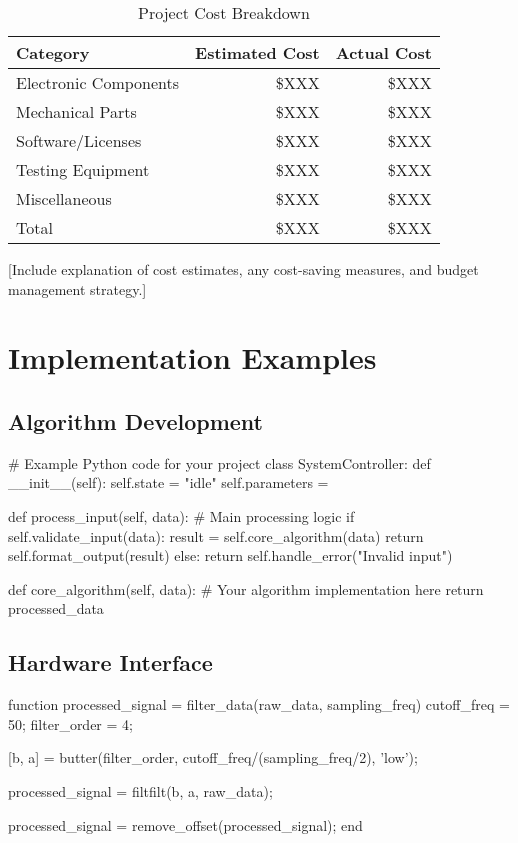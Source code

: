 \documentclass[final]{designreport}
\begin{document}
\begin{table}[htbp]
\centering
\caption{Project Cost Breakdown}
\begin{tabular}{@{}lrr@{}}
\toprule
Category & Estimated Cost & Actual Cost \\
\midrule
Electronic Components & \$XXX & \$XXX \\
Mechanical Parts & \$XXX & \$XXX \\
Software/Licenses & \$XXX & \$XXX \\
Testing Equipment & \$XXX & \$XXX \\
Miscellaneous & \$XXX & \$XXX \\
\midrule
Total & \$XXX & \$XXX \\
\bottomrule
\end{tabular}
\end{table}

[Include explanation of cost estimates, any cost-saving measures, and budget management strategy.]

\section{Implementation Examples}

\subsection{Algorithm Development}

\begin{reportpython}[caption={Core Algorithm Implementation}]
# Example Python code for your project
class SystemController:
    def __init__(self):
        self.state = "idle"
        self.parameters = {}
    
    def process_input(self, data):
        # Main processing logic
        if self.validate_input(data):
            result = self.core_algorithm(data)
            return self.format_output(result)
        else:
            return self.handle_error("Invalid input")
    
    def core_algorithm(self, data):
        # Your algorithm implementation here
        return processed_data
\end{reportpython}

\subsection{Hardware Interface}

\begin{reportmatlab}[caption={Signal Processing Functions}]
function processed_signal = filter_data(raw_data, sampling_freq)
    cutoff_freq = 50; %
    filter_order = 4;
    
    [b, a] = butter(filter_order, cutoff_freq/(sampling_freq/2), 'low');
    
    processed_signal = filtfilt(b, a, raw_data);
    
    processed_signal = remove_offset(processed_signal);
end
\end{reportmatlab}
\end{document}
